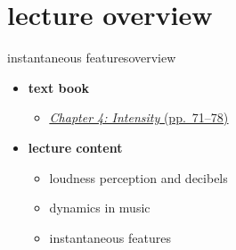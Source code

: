 

\subtitle{Part 5.1: Intensity}


	

    \section[overview]{lecture overview}
        \begin{frame}{instantaneous features}{overview}
            \begin{itemize}
                \item   \textbf{text book}  
                    \begin{itemize}
                        \item   \href{http://ieeexplore.ieee.org/xpl/articleDetails.jsp?tp=&arnumber=6331121&}{\underline{\textit{Chapter 4: Intensity} (pp.~71--78)}}
                    \end{itemize}
                \bigskip
                \item<2->   \textbf{lecture content}
                    \begin{itemize}
                        \item<2->   loudness perception and decibels
                        \item<3->   dynamics in music
                        \item<4->   instantaneous features
                    \end{itemize}
            \end{itemize}
        \end{frame}

